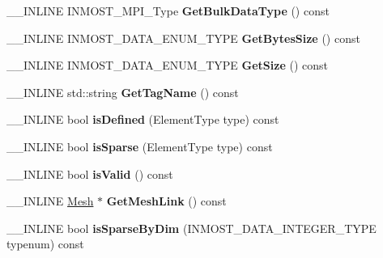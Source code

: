 \begin{DoxyCompactItemize}
\item 
\hypertarget{classINMOST_1_1Tag_ad21265a8333fa926aec279374881511c}{\-\_\-\-\_\-\-I\-N\-L\-I\-N\-E I\-N\-M\-O\-S\-T\-\_\-\-M\-P\-I\-\_\-\-Type {\bfseries Get\-Bulk\-Data\-Type} () const }\label{classINMOST_1_1Tag_ad21265a8333fa926aec279374881511c}

\item 
\hypertarget{classINMOST_1_1Tag_a98e30737d0fd1ce864fca88106bf4aa0}{\-\_\-\-\_\-\-I\-N\-L\-I\-N\-E I\-N\-M\-O\-S\-T\-\_\-\-D\-A\-T\-A\-\_\-\-E\-N\-U\-M\-\_\-\-T\-Y\-P\-E {\bfseries Get\-Bytes\-Size} () const }\label{classINMOST_1_1Tag_a98e30737d0fd1ce864fca88106bf4aa0}

\item 
\hypertarget{classINMOST_1_1Tag_ae74774d21aaf2dd820d2a5ea1bb43f9d}{\-\_\-\-\_\-\-I\-N\-L\-I\-N\-E I\-N\-M\-O\-S\-T\-\_\-\-D\-A\-T\-A\-\_\-\-E\-N\-U\-M\-\_\-\-T\-Y\-P\-E {\bfseries Get\-Size} () const }\label{classINMOST_1_1Tag_ae74774d21aaf2dd820d2a5ea1bb43f9d}

\item 
\hypertarget{classINMOST_1_1Tag_acc819bbeee997e187b3da9b07a703543}{\-\_\-\-\_\-\-I\-N\-L\-I\-N\-E std\-::string {\bfseries Get\-Tag\-Name} () const }\label{classINMOST_1_1Tag_acc819bbeee997e187b3da9b07a703543}

\item 
\hypertarget{classINMOST_1_1Tag_aef6923542b80e0e8ec121f8f95eeb5b7}{\-\_\-\-\_\-\-I\-N\-L\-I\-N\-E bool {\bfseries is\-Defined} (Element\-Type type) const }\label{classINMOST_1_1Tag_aef6923542b80e0e8ec121f8f95eeb5b7}

\item 
\hypertarget{classINMOST_1_1Tag_a0151597a4ccd7f9ad8ffe3b4774c2040}{\-\_\-\-\_\-\-I\-N\-L\-I\-N\-E bool {\bfseries is\-Sparse} (Element\-Type type) const }\label{classINMOST_1_1Tag_a0151597a4ccd7f9ad8ffe3b4774c2040}

\item 
\hypertarget{classINMOST_1_1Tag_a49c1f08eeb172434cd6f35fd3d4fd35c}{\-\_\-\-\_\-\-I\-N\-L\-I\-N\-E bool {\bfseries is\-Valid} () const }\label{classINMOST_1_1Tag_a49c1f08eeb172434cd6f35fd3d4fd35c}

\item 
\hypertarget{classINMOST_1_1Tag_a28fb2801ba18b08e8b10a927a01f53f8}{\-\_\-\-\_\-\-I\-N\-L\-I\-N\-E \hyperlink{classINMOST_1_1Mesh}{Mesh} $\ast$ {\bfseries Get\-Mesh\-Link} () const }\label{classINMOST_1_1Tag_a28fb2801ba18b08e8b10a927a01f53f8}

\item 
\hypertarget{classINMOST_1_1Tag_a93a0cb0d316f8496372276727c0a070d}{\-\_\-\-\_\-\-I\-N\-L\-I\-N\-E bool {\bfseries is\-Sparse\-By\-Dim} (I\-N\-M\-O\-S\-T\-\_\-\-D\-A\-T\-A\-\_\-\-I\-N\-T\-E\-G\-E\-R\-\_\-\-T\-Y\-P\-E typenum) const }\label{classINMOST_1_1Tag_a93a0cb0d316f8496372276727c0a070d}


\end{DoxyCompactItemize}
